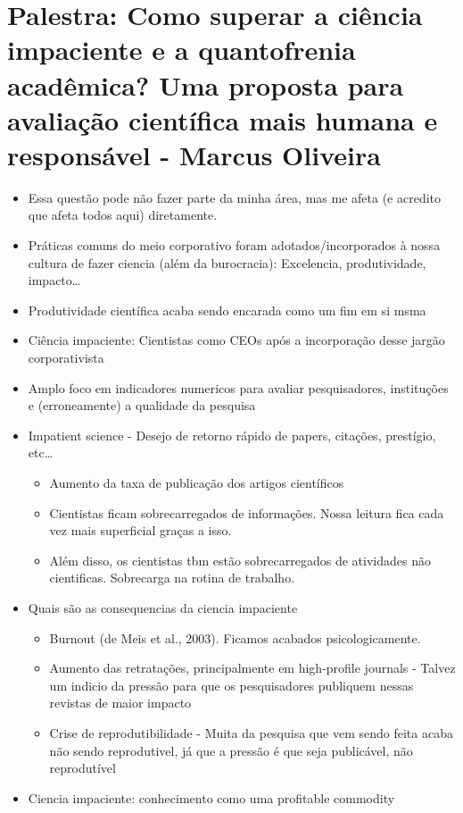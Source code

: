 \documentclass[11pt]{article}
\begin{document}
\section{Palestra: Como superar a ciência impaciente e a quantofrenia acadêmica?  Uma proposta para avaliação científica mais humana e responsável - Marcus Oliveira}
\label{sec:orgdcd68c4}
\begin{itemize}
\item Essa questão pode não fazer parte da minha área, mas me afeta (e acredito que afeta todos aqui) diretamente.
\item Práticas comuns do meio corporativo foram adotados/incorporados à nossa cultura de fazer ciencia (além da burocracia): Excelencia, produtividade, impacto\ldots{}
\item Produtividade científica acaba sendo encarada como um fim em si msma
\item Ciência impaciente: Cientistas como CEOs após a incorporação desse jargão corporativista
\item Amplo foco em indicadores numericos para avaliar pesquisadores, instituções e (erroneamente) a qualidade da pesquisa
\item Impatient science - Desejo de retorno rápido de papers, citações, prestígio, etc\ldots{}
\begin{itemize}
\item Aumento da taxa de publicação dos artigos científicos
\item Cientistas ficam sobrecarregados de informações. Nossa leitura fica cada vez mais superficial graças a isso.
\item Além disso, os cientistas tbm estão sobrecarregados de atividades não cientificas. Sobrecarga na rotina de trabalho.
\end{itemize}
\item Quais são as consequencias da ciencia impaciente
\begin{itemize}
\item Burnout (de Meis et al., 2003). Ficamos acabados psicologicamente.
\item Aumento das retratações, principalmente em high-profile journals - Talvez um indicio da pressão para que os pesquisadores publiquem nessas revistas de maior impacto
\item Crise de reprodutibilidade - Muita da pesquisa que vem sendo feita acaba não sendo reprodutivel, já que a pressão é que seja publicável, não reprodutível
\end{itemize}
\item Ciencia impaciente: conhecimento como uma profitable commodity

\end{itemize}
\end{document}
